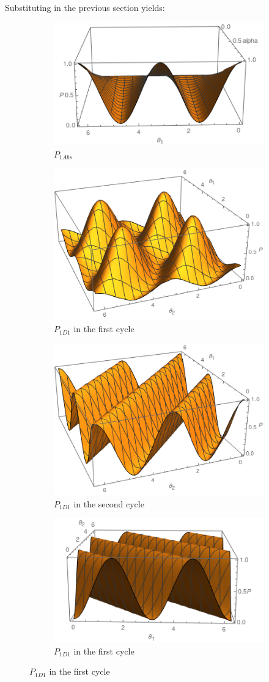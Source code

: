 \documentclass[11pt]{article}
\begin{document}
Substituting in the previous section yields:
\begin{figure}[h!]
\centering
\begin{subfigure}[b]{0.40\linewidth}
\includegraphics[width=\linewidth,height=3.5 cm]{p1cabs.png}
\caption{$P_{1Abs}$}
\label{fig:BS1}
\end{subfigure}
\begin{subfigure}[b]{0.40\linewidth}
\includegraphics[width=\linewidth,height=3.5 cm]{p1cd21.png}
\caption{$P_{1D1}$ in the first cycle }
\label{fig:BS1}
\end{subfigure}
\begin{subfigure}[b]{0.40\linewidth}
\includegraphics[width=\linewidth,height=3.5 cm]{p1cd22.png}
\caption{$P_{1D1}$ in the second cycle}
\label{fig:BS1}
\end{subfigure}
\begin{subfigure}[b]{0.40\linewidth}
\includegraphics[width=\linewidth,height=3.5 cm]{p1cd11.png}
\caption{$P_{1D1} $ in the first cycle}
\label{fig:westminster_aerea}
\end{subfigure}

\end{figure}
\end{document}
